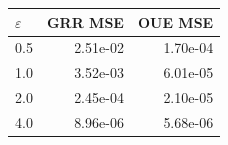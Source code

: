 \begin{tabular}{lrr}
\toprule
$\varepsilon$ & GRR MSE & OUE MSE \\
\midrule
0.5 & 2.51e-02 & 1.70e-04 \\
1.0 & 3.52e-03 & 6.01e-05 \\
2.0 & 2.45e-04 & 2.10e-05 \\
4.0 & 8.96e-06 & 5.68e-06 \\
\bottomrule
\end{tabular}
